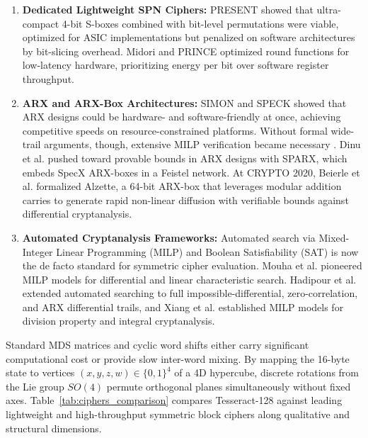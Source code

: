 \documentclass[review,12pt]{elsarticle}
\begin{document}
\begin{enumerate}
    \item \textbf{Dedicated Lightweight SPN Ciphers:} PRESENT \cite{bogdanov2007present} showed that ultra-compact 4-bit S-boxes combined with bit-level permutations were viable, optimized for ASIC implementations but penalized on software architectures by bit-slicing overhead. Midori \cite{banik2015midori} and PRINCE \cite{borghoff2012prince} optimized round functions for low-latency hardware, prioritizing energy per bit over software register throughput.
    \item \textbf{ARX and ARX-Box Architectures:} SIMON and SPECK \cite{beaulieu2015simon} showed that ARX designs could be hardware- and software-friendly at once, achieving competitive speeds on resource-constrained platforms. Without formal wide-trail arguments, though, extensive MILP verification became necessary \cite{fu2016milp}. Dinu et al. \cite{dunkelman2016sparx} pushed toward provable bounds in ARX designs with SPARX, which embeds SpecX ARX-boxes in a Feistel network. At CRYPTO 2020, Beierle et al. \cite{beierle2020alzette} formalized Alzette, a 64-bit ARX-box that leverages modular addition carries to generate rapid non-linear diffusion with verifiable bounds against differential cryptanalysis.
    \item \textbf{Automated Cryptanalysis Frameworks:} Automated search via Mixed-Integer Linear Programming (MILP) and Boolean Satisfiability (SAT) is now the de facto standard for symmetric cipher evaluation. Mouha et al. \cite{mouha2011differential} pioneered MILP models for differential and linear characteristic search. Hadipour et al. \cite{hadipour2023impossible, hadipour2023milp} extended automated searching to full impossible-differential, zero-correlation, and ARX differential trails, and Xiang et al. \cite{xiang2016milp} established MILP models for division property and integral cryptanalysis.
\end{enumerate}

Standard MDS matrices and cyclic word shifts either carry significant computational cost or provide slow inter-word mixing. By mapping the 16-byte state to vertices $(x, y, z, w) \in \{0, 1\}^4$ of a 4D hypercube, discrete rotations from the Lie group $SO(4)$ permute orthogonal planes simultaneously without fixed axes. Table~\ref{tab:ciphers_comparison} compares Tesseract-128 against leading lightweight and high-throughput symmetric block ciphers along qualitative and structural dimensions.
\end{document}
